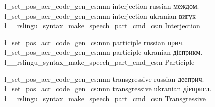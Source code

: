 \l_set_pos_acr_code_gen_cs:nnn { interjection } { russian } { междом. }
\l_set_pos_acr_code_gen_cs:nnn { interjection } { ukranian } { вигук }
\l__rslingu_syntax_make_speech_part_cmd_cs:n { Interjection }



\l_set_pos_acr_code_gen_cs:nnn { participle } { russian } { прич. }
\l_set_pos_acr_code_gen_cs:nnn { participle } { ukranian } { дієприкм. }
\l__rslingu_syntax_make_speech_part_cmd_cs:n { Participle }



\l_set_pos_acr_code_gen_cs:nnn { transgressive } { russian } { дееприч. }
\l_set_pos_acr_code_gen_cs:nnn { transgressive } { ukranian } { дієприсл. }
\l__rslingu_syntax_make_speech_part_cmd_cs:n { Transgressive }



